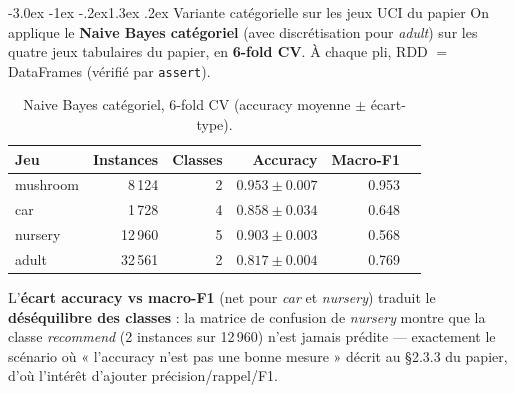 \documentclass[11pt,a4paper]{article}
\makeatletter
\newcommand{\code}[1]{\lstinline[style=py]!#1!}
\renewcommand\subsection{\@startsection{subsection}{2}{\z@}%
  {-3.0ex \@plus -1ex \@minus -.2ex}{1.3ex \@plus.2ex}%
  {\normalfont\large\bfseries\color{primary!88!black}}}
\makeatother
\begin{document}
\subsection{Variante catégorielle sur les jeux UCI du papier}
\label{sec:uci}
On applique le \textbf{Naive Bayes catégoriel} (avec discrétisation pour \emph{adult}) sur les
quatre jeux tabulaires du papier, en \textbf{6-fold CV}. À chaque pli, RDD $=$ DataFrames
(vérifié par \code{assert}).
\begin{table}[H]
\centering\small
\begin{tabular}{@{}lrrrrr@{}}
\toprule
\textbf{Jeu} & \textbf{Instances} & \textbf{Classes} & \textbf{Accuracy} & \textbf{Macro-F1} \\
\midrule
mushroom & 8\,124  & 2 & $0.953 \pm 0.007$ & 0.953 \\
car      & 1\,728  & 4 & $0.858 \pm 0.034$ & 0.648 \\
nursery  & 12\,960 & 5 & $0.903 \pm 0.003$ & 0.568 \\
adult    & 32\,561 & 2 & $0.817 \pm 0.004$ & 0.769 \\
\bottomrule
\end{tabular}
\caption{Naive Bayes catégoriel, 6-fold CV (accuracy moyenne $\pm$ écart-type).}
\end{table}
L'\textbf{écart accuracy vs macro-F1} (net pour \emph{car} et \emph{nursery}) traduit le
\textbf{déséquilibre des classes} : la matrice de confusion de \emph{nursery} montre que la
classe \emph{recommend} (2 instances sur 12\,960) n'est jamais prédite --- exactement le
scénario où « l'accuracy n'est pas une bonne mesure » décrit au §2.3.3 du papier, d'où
l'intérêt d'ajouter précision/rappel/F1.
\end{document}
